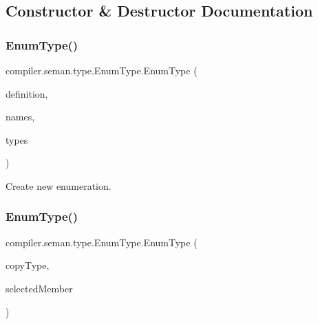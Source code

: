 \subsection{Constructor \& Destructor Documentation}
\mbox{\label{classcompiler_1_1seman_1_1type_1_1_enum_type_aed957839a01ce4250e5ece5fe8a33cc4}} 
\subsubsection{\texorpdfstring{Enum\+Type()}{EnumType()}\hspace{0.1cm}{\footnotesize\ttfamily [1/2]}}
{\footnotesize\ttfamily compiler.\+seman.\+type.\+Enum\+Type.\+Enum\+Type (\begin{DoxyParamCaption}\item[{\hyperlink{classcompiler_1_1abstr_1_1tree_1_1def_1_1_abs_enum_def}{Abs\+Enum\+Def}}]{definition,  }\item[{Array\+List$<$ String $>$}]{names,  }\item[{Array\+List$<$ \hyperlink{classcompiler_1_1seman_1_1type_1_1_class_type}{Class\+Type} $>$}]{types }\end{DoxyParamCaption})}

Create new enumeration. \mbox{\label{classcompiler_1_1seman_1_1type_1_1_enum_type_ac721d471ef958eb1d784f4e8e990b135}} 
\subsubsection{\texorpdfstring{Enum\+Type()}{EnumType()}\hspace{0.1cm}{\footnotesize\ttfamily [2/2]}}
{\footnotesize\ttfamily compiler.\+seman.\+type.\+Enum\+Type.\+Enum\+Type (\begin{DoxyParamCaption}\item[{\hyperlink{classcompiler_1_1seman_1_1type_1_1_enum_type}{Enum\+Type}}]{copy\+Type,  }\item[{String}]{selected\+Member }\end{DoxyParamCaption})}

